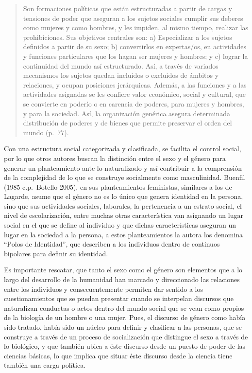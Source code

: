 \begin{quote}
    Son formaciones políticas que están estructuradas a partir de cargas y
    tensiones de poder que aseguran a los sujetos sociales cumplir sus deberes
    como mujeres y como hombres, y les impiden, al mismo tiempo, realizar
    las prohibiciones.
    Sus objetivos centrales son: a) Especializar a los sujetos definidos a partir de
    su sexo;
    b) convertirlos en expertas/os, en actividades y funciones particulares
    que los hagan ser mujeres y hombres;
    y c) lograr la continuidad del mundo así estructurado.
    Así, a través de variados mecanismos los sujetos quedan incluidos o excluidos de
    ámbitos y relaciones, y ocupan posiciones jerárquicas.
    Además, a las funciones y a las actividades asignadas se les confiere valor
    económico, social y cultural, que se convierte en poderío o en carencia de
    poderes, para mujeres y hombres, y para la sociedad.
    Así, la organización genérica asegura determinada distribución de poderes y de
    bienes que permite preservar el orden del mundo (p.~77).
\end{quote}

Con una estructura social categorizada y clasificada, se facilita el control
social, por lo que otros autores buscan la distinción entre el sexo y el género
para generar un planteamiento ante lo naturalizado y así contribuir a la
comprensión de la complejidad de lo que se construye socialmente como
masculinidad.
Buenfil (1985 c.p.~Botello 2005), en sus planteamientos feministas, similares
a los de Lagarde, asume que el género no es lo único que genera identidad en la
persona, sino que sus actividades sociales, laborales, la pertenencia a un
estrato social, el nivel de escolarización, entre muchas otras característica
van asignando un lugar social en el que se define al individuo y que dichas
características aseguran un lugar en la sociedad a la persona, a estos
planteamientos la autora los denomina “Polos de Identidad”, que describen a los
individuos dentro de continuos bipolares para definir su identidad.

Es importante rescatar, que tanto el sexo como el género son elementos que a lo
largo del desarrollo de la humanidad han marcado y direccionado las relaciones
entre los individuos y consecuentemente permiten dar sentido a los
cuestionamientos que se puedan presentar cuando se interpelan discursos que
naturalizan conductas o actos dentro del mundo social que se vean como propios
de la biología de un hombre o una mujer.
Pues, el discurso de género como había sido tratado, había sido un núcleo para
definir y clasificar a las personas, que se construye a través de un proceso de
socialización que distingue el sexo a través de lo biológico, y que también
ubica a éste discurso desde un puesto de poder de las ciencias básicas, lo que
implica que situar éste discurso desde la ciencia tiene también una carga
política.

